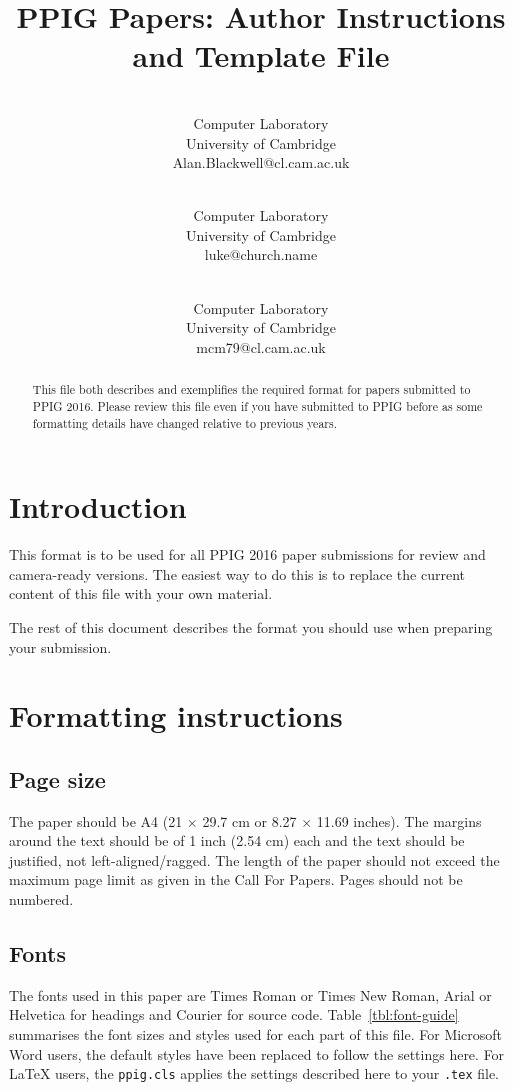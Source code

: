 \documentclass{ppig}
\title{PPIG Papers: Author Instructions and Template File}
\author{\authorname{Alan F. Blackwell} \\
    Computer Laboratory \\
    University of Cambridge \\
    Alan.Blackwell@cl.cam.ac.uk \\
    \and
    \authorname{Luke Church} \\
    Computer Laboratory \\
    University of Cambridge \\
    luke@church.name \\
    \and
    \authorname{Mariana M\unichar{259}r\unichar{259}\unichar{537}oiu} \\
    Computer Laboratory \\
    University of Cambridge \\
    mcm79@cl.cam.ac.uk}
\date{}
\begin{document}
\maketitle
\thispagestyle{empty}

\begin{abstract}
This file both describes and exemplifies the required format for papers submitted to PPIG 2016. Please review this file even if you have submitted to PPIG before as some formatting details have changed relative to previous years.
\end{abstract}

\section{Introduction}

This format is to be used for all PPIG 2016 paper submissions for review and camera-ready versions. The easiest way to do this is to replace the current content of this file with your own material.

The rest of this document describes the format you should use when preparing your submission.

\section{Formatting instructions}

\subsection{Page size}

The paper should be A4 (21 $\times$ 29.7 cm or 8.27 $\times$ 11.69 inches). The margins around the text should be of 1 inch (2.54 cm) each and the text should be justified, not left-aligned/ragged. The length of the paper should not exceed the maximum page limit as given in the Call For Papers. Pages should not be numbered.

\subsection{Fonts}

The fonts used in this paper are Times Roman or Times New Roman, Arial or Helvetica for headings and Courier for source code. Table~\ref{tbl:font-guide} summarises the font sizes and styles used for each part of this file. For Microsoft Word users, the default styles have been replaced to follow the settings here. For \LaTeX{} users, the \texttt{ppig.cls} applies the settings described here to your \texttt{.tex} file.
\end{document}
